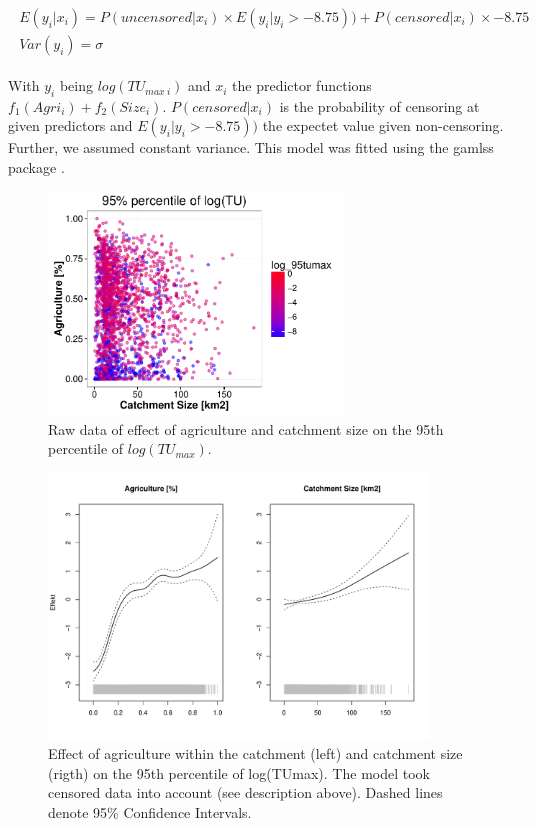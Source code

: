 \documentclass[pdftex,a4paper]{scrreprt}
\begin{document}
\begin{align}
\begin{split}
	E(y_i | x_i) = P(uncensored|x_i) \times E(y_i | y_i > -8.75)) + P(censored|x_i) \times -8.75\\
	Var(y_i) = \sigma
\end{split}
\end{align}

With $y_i$ being $log(TU_{max~i})$ and $x_i$ the predictor functions $f_1(Agri_i) + f_2(Size_i)$. $P(censored|x_i)$ is the probability of censoring at given predictors and $E(y_i | y_i > -8.75))$ the expectet value given non-censoring. Further, we assumed constant variance. This model was fitted using the gamlss package \citep{stasinopoulos_generalized_2007}.


\begin{figure}[h]
	\centering
	\includegraphics[width = 0.7\textwidth]{ezgagritu}
	\caption{Raw data of effect of agriculture and catchment size on the 95th percentile of $log(TU_{max})$.}
	\label{fig:ezgagritu}
\end{figure}

\begin{figure}[h]
	\centering
	\includegraphics[width = 0.9\textwidth]{ezgagritumodel}
	\caption{Effect of agriculture within the catchment (left) and catchment size (rigth) on the 95th percentile of log(TUmax). The model took censored data into account (see description above). Dashed lines denote 95\% Confidence Intervals.}
	\label{fig:ezgagritumodel}
\end{figure}








\end{document}
